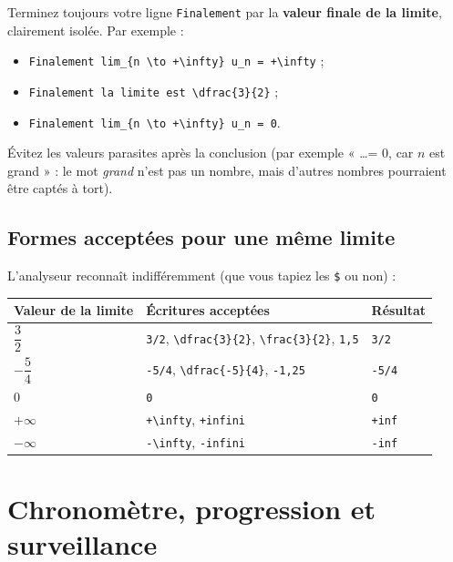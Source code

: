 \documentclass[11pt,a4paper]{article}
\begin{document}
\begin{retenir}
Terminez toujours votre ligne \texttt{Finalement} par la \textbf{valeur finale
de la limite}, clairement isolée. Par exemple :
\begin{itemize}
  \item \verb|Finalement lim_{n \to +\infty} u_n = +\infty| ;
  \item \verb|Finalement la limite est \dfrac{3}{2}| ;
  \item \verb|Finalement lim_{n \to +\infty} u_n = 0|.
\end{itemize}
Évitez les valeurs parasites après la conclusion (par exemple « \dots = 0,
car \(n\) est grand » : le mot \emph{grand} n'est pas un nombre, mais
d'autres nombres pourraient être captés à tort).
\end{retenir}

\subsection{Formes acceptées pour une même limite}

L'analyseur reconnaît indifféremment (que vous tapiez les \texttt{\$} ou non) :

\begin{center}
\footnotesize
\renewcommand{\arraystretch}{1.3}
\begin{tabular}{@{}p{3.4cm}p{8.6cm}p{2.8cm}@{}}
\toprule
\textbf{Valeur de la limite} & \textbf{Écritures acceptées} & \textbf{Résultat} \\
\midrule
\(\dfrac{3}{2}\)     & \verb|3/2|, \verb|\dfrac{3}{2}|, \verb|\frac{3}{2}|, \verb|1,5| & \texttt{3/2} \\
\(-\dfrac{5}{4}\)   & \verb|-5/4|, \verb|\dfrac{-5}{4}|, \verb|-1,25| & \texttt{-5/4} \\
\(0\)               & \verb|0| & \texttt{0} \\
\(+\infty\)         & \verb|+\infty|, \verb|+infini| & \texttt{+inf} \\
\(-\infty\)         & \verb|-\infty|, \verb|-infini| & \texttt{-inf} \\
\bottomrule
\end{tabular}
\end{center}

\section{Chronomètre, progression et surveillance}
\label{sec:surveillance}
\end{document}
